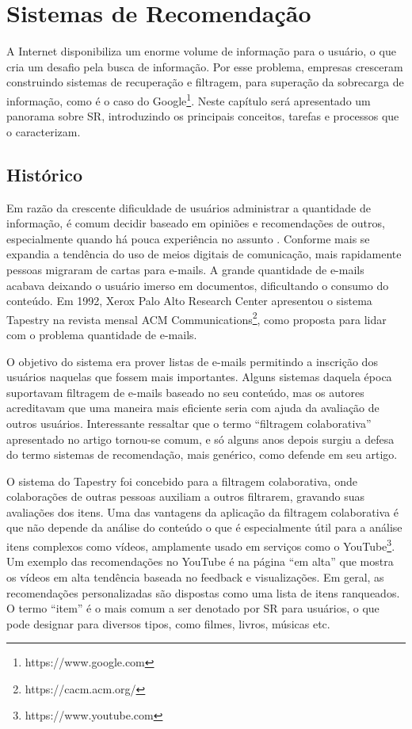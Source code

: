 \chapter{Sistemas de Recomendação}
\label{cap:recsys}

A Internet disponibiliza um enorme volume de informação para o usuário, o que cria um desafio pela busca de informação. Por esse problema, empresas cresceram construindo sistemas de recuperação e filtragem, para superação da sobrecarga de informação, como é o caso do Google\footnote{https://www.google.com}. Neste capítulo será apresentado um panorama sobre SR, introduzindo os principais conceitos, tarefas e processos que o caracterizam.

\section{Histórico}
Em razão da crescente dificuldade de usuários administrar a quantidade de informação, é comum decidir baseado em opiniões e recomendações de outros, especialmente quando há pouca experiência no assunto \citep{Resnick:1997:RS:245108.245121}. Conforme mais se expandia a tendência do uso de meios digitais de comunicação, mais rapidamente pessoas migraram de cartas para e-mails. A grande quantidade de e-mails acabava deixando o usuário imerso em documentos, dificultando o consumo do conteúdo. Em 1992, Xerox Palo Alto Research Center apresentou o sistema Tapestry \citep{Goldberg:1992:UCF:138859.138867} na revista mensal ACM Communications\footnote{https://cacm.acm.org/}, como proposta para lidar com o problema quantidade de e-mails. 

O objetivo do sistema era prover listas de e-mails permitindo a inscrição dos usuários naquelas que fossem mais importantes. Alguns sistemas daquela época suportavam filtragem de e-mails baseado no seu conteúdo, mas os autores acreditavam que uma maneira mais eficiente seria com ajuda da avaliação de outros usuários. Interessante ressaltar que o termo “filtragem colaborativa” apresentado no artigo tornou-se comum, e só alguns anos depois surgiu a defesa do termo sistemas de recomendação, mais genérico, como defende \cite{Resnick:1997:RS:245108.245121} em seu artigo.

O sistema do Tapestry foi concebido para a filtragem colaborativa, onde colaborações de outras pessoas auxiliam a outros filtrarem, gravando suas avaliações dos itens. Uma das vantagens da aplicação da filtragem colaborativa é que não depende da análise do conteúdo o que é especialmente útil para a análise itens complexos como vídeos, amplamente usado em serviços como o YouTube\footnote{https://www.youtube.com}. Um exemplo das recomendações no YouTube é na página “em alta” que mostra os vídeos em alta tendência baseada no feedback e visualizações. Em geral, as recomendações personalizadas são dispostas como uma lista de itens ranqueados. O termo “item” é o mais comum a ser denotado por SR para usuários, o que pode designar para diversos tipos, como filmes, livros, músicas etc. 

